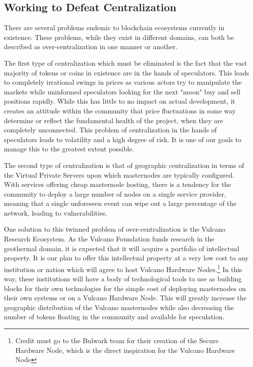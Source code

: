 \documentclass[A4paper, 12pt]{article}
\begin{document}
\subsection{Working to Defeat Centralization}
There are several problems endemic to blockchain ecosystems currently in existence. These problems, while they exist in different domains, can both be described as over-centralization in one manner or another. 

The first type of centralization which must be eliminated is the fact that the vast majority of tokens or coins in existence are in the hands of speculators. This leads to completely irrational swings in prices as various actors try to manipulate the markets while uninformed speculators looking for the next "moon" buy and sell positions rapidly. While this has little to no impact on actual development, it creates an attitude within the community that price fluctuations in some way determine or reflect the fundamental health of the project, when they are completely unconnected. This problem of centralization in the hands of speculators leads to volatility and a high degree of risk. It is one of our goals to manage this to the greatest extent possible.

The second type of centralization is that of geographic centralization in terms of the Virtual Private Servers upon which masternodes are typically configured. With services offering cheap masternode hosting, there is a tendency for the community to deploy a large number of nodes on a single service provider, meaning that a single unforeseen event can wipe out a large percentage of the network, leading to vulnerabilities. 

One solution to this twinned problem of over-centralization is the Vulcano Research Ecosystem. As the Vulcano Foundation funds research in the geothermal domain, it is expected that it will acquire a portfolio of intellectual property. It is our plan to offer this intellectual property at a very low cost to any institution or nation which will agree to host Vulcano Hardware Nodes.\footnote{Credit must go to the Bulwark team for their creation of the Secure Hardware Node, which is the direct inspiration for the Vulcano Hardware Node} In this way, these institutions will have a body of technological tools to use as building blocks for their own technologies for the simple cost of deploying masternodes on their own systems or on a Vulcano Hardware Node. This will greatly increase the geographic distribution of the Vulcano masternodes while also decreasing the number of tokens floating in the community and available for speculation.
\end{document}
